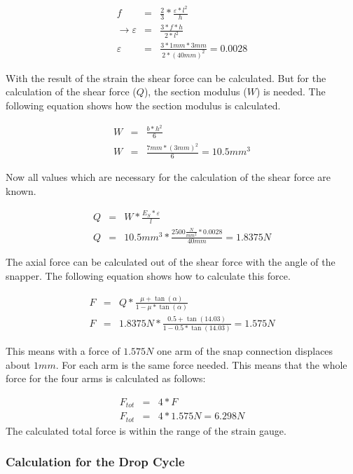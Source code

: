 \documentclass[a4paper,12pt]{scrreprt}
\begin{document}
\begin{eqnarray}
f &=& \frac{2}{3}*\frac{\varepsilon*l^{2}}{h}\label{eq:displacement the strain}\\
\rightarrow \varepsilon &=& \frac{3*f*h}{2*l^{2}}\\
\varepsilon  &=& \frac{3*1mm*3mm}{2*(40mm)^{2}} = 0.0028
\end{eqnarray}

With the result of the strain the shear force can be calculated. But for the calculation of the shear force ($Q$), the section modulus ($W$) is needed. The following equation shows how the section modulus is calculated.

\begin{eqnarray}
W &=& \frac{b*h^{2}}{6}\\
W &=& \frac{7mm*(3mm)^{2}}{6} = 10.5 mm^{3}
\end{eqnarray}

Now all values which are necessary for the calculation of the shear force are known. 

\begin{eqnarray}
Q &=& W*\frac{E_{S}*\varepsilon}{l}\\
Q &=& 10.5mm^{3}* \frac{2500\frac{N}{mm^{2}}*0.0028}{40 mm} = 1.8375 N
\end{eqnarray}

The axial force can be calculated out of the shear force with the angle of the snapper. The following equation shows how to calculate this force.

\begin{eqnarray}
F &=& Q*\frac{\mu + \tan (\alpha)}{1 - \mu * \tan (\alpha)}\\
F &=& 1.8375N*\frac{0.5 + \tan(14.03)}{1 - 0.5 * \tan(14.03)} = 1.575 N
\end{eqnarray}

This means with a force of $1.575 N$ one arm of the snap connection displaces about $1mm$. For each arm is the same force needed. This means that the whole force for the four arms is calculated as follows:

\begin{eqnarray}
F_{tot} &=& 4 * F \\
F_{tot}  &=& 4 * 1.575N = 6.298 N
\end{eqnarray}
The calculated total force is within the range of the strain gauge.

\subsubsection{Calculation for the Drop Cycle}
\end{document}
